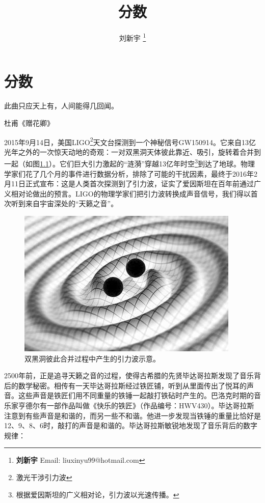 \documentclass[b5paper]{ctexart}
\begin{document}
\title{分数}

\author{刘新宇
\thanks{{\bfseries 刘新宇} \newline
  Email: liuxinyu99@hotmail.com \newline}
  }

\maketitle
\fi


\ifx\wholebook\relax
\chapter{分数}
\fi

\epigraph{此曲只应天上有，人间能得几回闻。}{杜甫《赠花卿》}

2015年9月14日，美国LIGO\footnote{激光干涉引力波}天文台探测到一个神秘信号GW150914。它来自13亿光年之外的一次惊天动地的奇观：一对双黑洞天体彼此靠近、吸引，旋转着合并到一起（如图\ref{fig:gravitational-wave}）。它们巨大引力激起的“涟漪”穿越13亿年时空\footnote{根据爱因斯坦的广义相对论，引力波以光速传播。}到达了地球。物理学家们花了几个月的事件进行数据分析，排除了可能的干扰因素，最终于2016年2月11日正式宣布：这是人类首次探测到了引力波，证实了爱因斯坦在百年前通过广义相对论做出的预言。LIGO的物理学家们把引力波转换成声音信号，我们得以首次听到来自宇宙深处的“天籁之音”。

\begin{figure}[htbp]
 \centering
 \includegraphics[scale=0.35]{img/gravitational-wave}
 \caption{双黑洞彼此合并过程中产生的引力波示意。}
 \label{fig:gravitational-wave}
\end{figure}

2500年前，正是追寻天籁之音的过程，使得古希腊的先贤毕达哥拉斯发现了音乐背后的数学秘密。相传有一天毕达哥拉斯经过铁匠铺，听到从里面传出了悦耳的声音。这些声音是铁匠们用不同重量的铁锤一起敲打铁砧时产生的。巴洛克时期的音乐家亨德尔有一部作品叫做《快乐的铁匠》（作品编号：HWV430）。毕达哥拉斯注意到有些声音是和谐的，而另一些不和谐。他进一步发现当铁锤的重量比恰好是12、9、8、6时，敲打的声音是和谐的。毕达哥拉斯敏锐地发现了音乐背后的数字规律：
\end{document}
